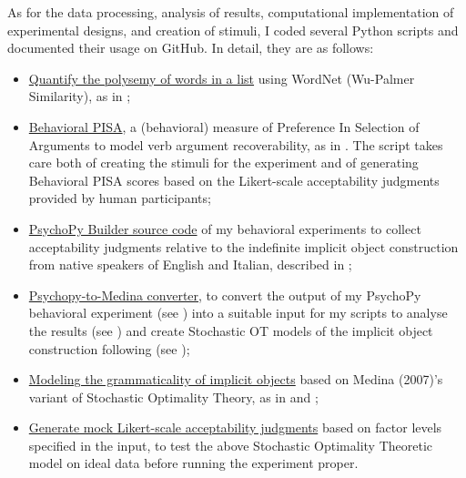 As for the data processing, analysis of results, computational implementation of experimental designs, and creation of stimuli, I coded several Python scripts and documented their usage on GitHub. In detail, they are as follows:
\begin{itemize}    
    \item \href{https://github.com/giuliacappelli/checkPolysemy}{Quantify the polysemy of words in a list} using WordNet (Wu-Palmer Similarity), as in ;
    \item \href{https://github.com/giuliacappelli/behavioralPISA}{Behavioral PISA}, a (behavioral) measure of Preference In Selection of Arguments to model verb argument recoverability, as in . The script takes care both of creating the stimuli for the experiment and of generating Behavioral PISA scores based on the Likert-scale acceptability judgments provided by human participants;
    \item \href{https://github.com/giuliacappelli/psychopy_exps}{PsychoPy Builder source code} of my behavioral experiments to collect acceptability judgments relative to the indefinite implicit object construction from native speakers of English and Italian, described in ;
    \item \href{https://github.com/giuliacappelli/PsychopyToMedina}{Psychopy-to-Medina converter}, to convert the output of my PsychoPy behavioral experiment (see ) into a suitable input for my scripts to analyse the results (see ) and create Stochastic OT models of the implicit object construction following \textcite{Medina2007} (see );
    \item \href{https://github.com/giuliacappelli/MedinaStochasticOptimalityTheory}{Modeling the grammaticality of implicit objects} based on Medina (2007)'s variant of Stochastic Optimality Theory, as in  and ;
    \item \href{https://github.com/giuliacappelli/generateMockLikertGrammaticalityJudgments}{Generate mock Likert-scale acceptability judgments} based on factor levels specified in the input, to test the above Stochastic Optimality Theoretic model on ideal data before running the experiment proper.
\end{itemize}

